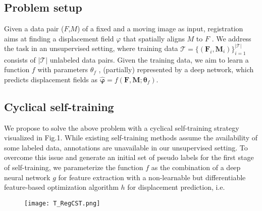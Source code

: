 \subsection{Problem setup}

Given a data pair ($F$,$M$) of a fixed and a moving image as input, registration aims at finding a displacement field $\varphi$ that spatially aligns $M$ to $F$ . We address the task in an unsupervised setting, where training data $\mathcal{T}=\{(\boldsymbol{F}_i,\boldsymbol{M}_i)\}_{i=1}^{|\mathcal{T}|}$  consists of $|\mathcal{T}|$ unlabeled data pairs. Given the training data, we aim to learn a function $f$ with parameters $\theta_f$ , (partially) represented by a deep network, which predicts displacement fields as $ \hat{\boldsymbol{\varphi}}=f(\boldsymbol{F},\boldsymbol{M};\boldsymbol{\theta}_f)$.

\subsection{Cyclical self-training}

We propose to solve the above problem with a cyclical self-training strategy visualized in Fig.1. While existing self-training methods assume the availability of some labeled data, annotations are unavailable in our unsupervised setting. To overcome this issue and generate an initial set of pseudo labels for the first stage of self-training, we parameterize the function $f$ as the combination of a deep neural network $g$ for feature extraction with a non-learnable but differentiable feature-based optimization algorithm $h$ for displacement prediction, i.e.

\begin{figure}
  \centering
  \texttt{[image: T\_RegCST.png]}
\end{figure}


